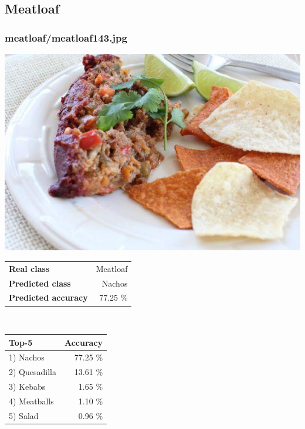 \subsection{Meatloaf}
    
\subsubsection{meatloaf/meatloaf143.jpg}

\begin{minipage}[t]{0.4\textwidth}
	\vspace{0pt}
	\includegraphics[width=\linewidth]{images/evaluation-images/meatloaf/meatloaf143.jpg}
\end{minipage}
\hfill
\begin{minipage}[t]{0.5\textwidth}
	\vspace{0pt}\raggedright
	\begin{tabularx}{\textwidth}{X r}
		\small \textbf{Real class} & \small Meatloaf\\
		\small \textbf{Predicted class} & \small Nachos\\
		\small \textbf{Predicted accuracy} & \small 77.25 \%
    \end{tabularx}\\
    
    \vspace{6pt}
	\begin{tabularx}{\textwidth}{X r}
        \small \textbf{Top-5} & \small \textbf{Accuracy} \\
        \hline
		\small 1) Nachos & \small 77.25 \%\\\small 2) Quesadilla & \small 13.61 \%\\\small 3) Kebabs & \small 1.65 \%\\\small 4) Meatballs & \small 1.10 \%\\\small 5) Salad & \small 0.96 \%
    \end{tabularx}
\end{minipage}
    
